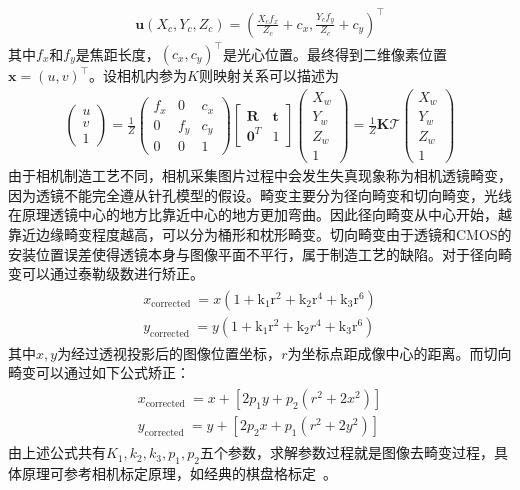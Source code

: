 \begin{align}
 \mathbf{u}\left(X_c, Y_c, Z_c\right)=\left(\frac{X_{c} f_{x}}{Z_{c}}+c_{x}, \frac{Y_{c} f_{y}}{Z_{c}}+c_{y}\right)^{\top}
\end{align}
其中$f_x$和$f_y$是焦距长度，$\left(c_{x}, c_{y}\right)^{\top}$是光心位置。最终得到二维像素位置$\boldsymbol{x}=(u, v)^{\top}$。设相机内参为$K$则映射关系可以描述为
\begin{align}
\left(\begin{array}{c}
u \\
v \\
1
\end{array}\right)=\frac{1}{Z}\left(\begin{array}{ccc}
f_{x} & 0 & c_{x} \\
0 & f_{y} & c_{y} \\
0 & 0 & 1
\end{array}\right)\left[\begin{array}{cc}
\boldsymbol{R} & \boldsymbol{t} \\
\mathbf{0}^{T} & 1
\end{array}\right]\left(\begin{array}{c}
X_{w} \\
Y_{w} \\
Z_{w} \\
1
\end{array}\right)=\frac{1}{Z} \boldsymbol{K} \mathcal{T}\left(\begin{array}{c}
X_{w} \\
Y_{w} \\
Z_{w} \\
1
\end{array}\right)
\end{align}
由于相机制造工艺不同，相机采集图片过程中会发生失真现象称为相机透镜畸变，因为透镜不能完全遵从针孔模型的假设。畸变主要分为径向畸变和切向畸变，光线在原理透镜中心的地方比靠近中心的地方更加弯曲。因此径向畸变从中心开始，越靠近边缘畸变程度越高，可以分为桶形和枕形畸变。切向畸变由于透镜和CMOS的安装位置误差使得透镜本身与图像平面不平行，属于制造工艺的缺陷。对于径向畸变可以通过泰勒级数进行矫正。
\begin{align}
\begin{array}{l}
x_{\text {corrected }}=x\left(1+\mathrm{k}_{1} \mathrm{r}^{2}+\mathrm{k}_{2} \mathrm{r}^{4}+\mathrm{k}_{3} \mathrm{r}^{6}\right) \\
y_{\text {corrected }}=y\left(1+\mathrm{k}_{1} \mathrm{r}^{2}+\mathrm{k}_{2} r^{4}+\mathrm{k}_{3} \mathrm{r}^{6}\right)
\end{array}
\end{align}
其中$x,y$为经过透视投影后的图像位置坐标，$r$为坐标点距成像中心的距离。而切向畸变可以通过如下公式矫正：
\begin{align}
\begin{array}{l}
x_{\text {corrected }}=x+\left[2 p_{1} y+p_{2}\left(r^{2}+2 x^{2}\right)\right] \\
y_{\text {corrected }}=y+\left[2 p_{2} x+p_{1}\left(r^{2}+2 y^{2}\right)\right]
\end{array}
\end{align}
由上述公式共有$K_1,k_2,k_3,p_1,p_2$五个参数，求解参数过程就是图像去畸变过程，具体原理可参考相机标定原理，如经典的棋盘格标定~\cite{888718}。

